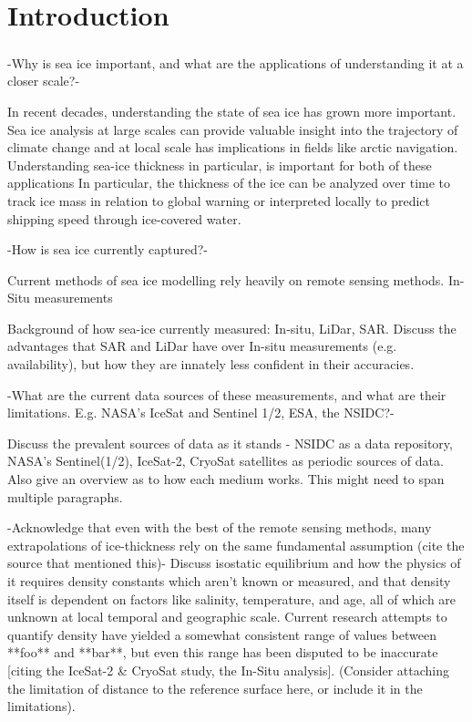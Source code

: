 \chapter{Introduction}
\label{sec:Introduction}

\paragraph{}
-Why is sea ice important, and what are the applications of understanding it at a closer scale?-

\indent In recent decades, understanding the state of sea ice has grown more important. Sea ice analysis at large scales can provide valuable insight into the trajectory of climate change and at local scale has implications in fields like arctic navigation. Understanding sea-ice thickness in particular, is important for both of these applications  In particular, the thickness of the ice can be analyzed over time to track ice mass in relation to global warning or interpreted locally to predict shipping speed through ice-covered water. \cite{sea-ice-properties}

-How is sea ice currently captured?- 

\indent Current methods of sea ice modelling rely heavily on remote sensing methods. In-Situ measurements 

Background of how sea-ice currently measured: In-situ, LiDar, SAR. Discuss the advantages that SAR and LiDar have over In-situ measurements (e.g. availability), but how they are innately less confident in their accuracies.

-What are the current data sources of these measurements, and what are their limitations. E.g. NASA's IceSat and Sentinel 1/2, ESA, the NSIDC?- 

\indent Discuss the prevalent sources of data as it stands - NSIDC as a data repository, NASA's Sentinel(1/2), IceSat-2, CryoSat satellites as periodic sources of data. Also give an overview as to how each medium works. This might need to span multiple paragraphs.


-Acknowledge that even with the best of the remote sensing methods, many extrapolations of ice-thickness rely on the same fundamental assumption (cite the source that mentioned this)-
Discuss isostatic equilibrium and how the physics of it requires density constants which aren't known or measured, and that density itself is dependent on factors like salinity, temperature, and age, all of which are unknown at local temporal and geographic scale. Current research attempts to quantify density have yielded a somewhat consistent range of values between **foo** and **bar**, but even this range has been disputed to be inaccurate [citing the IceSat-2 \& CryoSat study, the In-Situ analysis]. (Consider attaching the limitation of distance to the reference surface here, or include it in the limitations).

